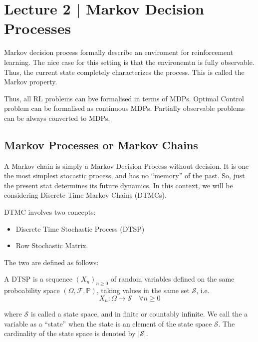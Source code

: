 \section{{Lecture 2 | Markov Decision Processes}}
Markov decision process formally describe an enviroment for reinforcement
learning. The nice case for this setting is that the environemtn is fully observable. Thus,
the current state completely characterizes the process. This is called the Markov property.

Thus, all RL problems can bve formalised in terms of MDPs. Optimal Control problem can be 
formalised as continuous MDPs. Partially observable problems can be always converted 
to MDPs.
\subsection{Markov Processes or Markov Chains}
A Markov chain is simply a Markov Decision Process without decision. It is one the 
most simplest stocastic process, and has no ``memory'' of the past. So, just the 
present stat determines its future dynamics. In this context, we will be considering
Discrete Time Markov Chains (DTMCs).

DTMC involves two concepts:
\begin{itemize}
    \item Discrete Time Stochastic Process (DTSP)
    \item Row Stochastic Matrix.
\end{itemize}

The two are defined as follows:

\begin{definition}
    A DTSP is a sequence \({(X_n)}_{n \geq 0}\) of random variables defined on the same proboability space
    \((\Omega, \mathcal{F} , \mathbb{P} )\), taking values in the same 
    set \(\mathcal{S} \), i.e.
    \[
        X_n : \Omega \rightarrow \mathcal{S} \quad \forall n \geq 0
    \]
\end{definition}
where \(\mathcal{S} \) is called a state space, and in finite or countably infinite.
We call the a variable as a ``state'' when the state is an element of the state space \(\mathcal{S} \).
The cardinality of the state space is denoted by \(|\mathcal{S} |\).

